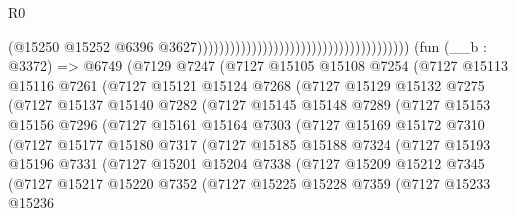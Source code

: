 \begin{lexlean}{R0}
\begin{coremodule}
                                                                                (@15250
                                                                                  @15252
                                                                                  @6396
                                                                                  @3627)))))))))))))))))))))))))))))))))))))))
    (fun (__b : @3372) =>
    @6749
      (@7129
        @7247
        (@7127
          @15105
          @15108
          @7254
          (@7127
            @15113
            @15116
            @7261
            (@7127
              @15121
              @15124
              @7268
              (@7127
                @15129
                @15132
                @7275
                (@7127
                  @15137
                  @15140
                  @7282
                  (@7127
                    @15145
                    @15148
                    @7289
                    (@7127
                      @15153
                      @15156
                      @7296
                      (@7127
                        @15161
                        @15164
                        @7303
                        (@7127
                          @15169
                          @15172
                          @7310
                          (@7127
                            @15177
                            @15180
                            @7317
                            (@7127
                              @15185
                              @15188
                              @7324
                              (@7127
                                @15193
                                @15196
                                @7331
                                (@7127
                                  @15201
                                  @15204
                                  @7338
                                  (@7127
                                    @15209
                                    @15212
                                    @7345
                                    (@7127
                                      @15217
                                      @15220
                                      @7352
                                      (@7127
                                        @15225
                                        @15228
                                        @7359
                                        (@7127
                                          @15233
                                          @15236

\end{coremodule}
\end{lexlean}
